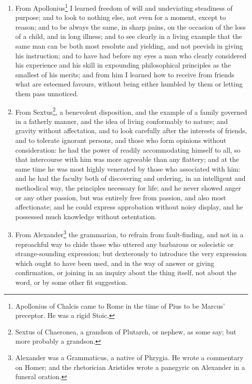 \begin{enumerate}
\item From Apollonius\footnote{Apollonius of Chalcis came to Rome in the time of Pius to be Marcus' preceptor. He was a rigid Stoic.} I learned freedom of will and undeviating steadiness of purpose; and to look to nothing else, not even for a moment, except to reason; and to be always the same, in sharp pains, on the occasion of the loss of a child, and in long illness; and to see clearly in a living example that the same man can be both most resolute and yielding, and not peevish in giving his instruction; and to have had before my eyes a man who clearly considered his experience and his skill in expounding philosophical principles as the smallest of his merits; and from him I learned how to receive from friends what are esteemed favours, without being either humbled by them or letting them pass unnoticed. 

\item From Sextus\footnote{Sextus of Chaeronea, a grandson of Plutarch, or nephew, as some say; but more probably a grandson.}, a benevolent disposition, and the example of a family governed in a fatherly manner, and the idea of living conformably to nature; and gravity without affectation, and to look carefully after the interests of friends, and to tolerate ignorant persons, and those who form opinions without consideration: he had the power of readily accommodating himself to all, so that intercourse with him was more agreeable than any flattery; and at the same time he was most highly venerated by those who associated with him: and he had the faculty both of discovering and ordering, in an intelligent and methodical way, the principles necessary for life; and he never showed anger or any other passion, but was entirely free from passion, and also most affectionate; and he could express approbation without noisy display, and he possessed much knowledge without ostentation. 

\item From Alexander\footnote{Alexander was a Grammaticus, a native of Phrygia. He wrote a commentary on Homer; and the rhetorician Aristides wrote a panegyric on Alexander in a funeral oration.} the grammarian, to refrain from fault-finding, and not in a reproachful way to chide those who uttered any barbarous or solecistic or strange-sounding expression; but dexterously to introduce the very expression which ought to have been used, and in the way of answer or giving confirmation, or joining in an inquiry about the thing itself, not about the word, or by some other fit suggestion. 


\end{enumerate}
